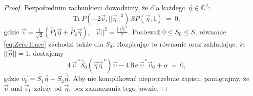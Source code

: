 {\begin{proof}
Bezpośrednim rachunkiem dowodzimy, że dla każdego
$\vec{\eta} \in \mathbb{C}^{2}$:
\begin{equation}
 \label{eq:ZeroTrace}
 \text{Tr} \, P(-2\vec{\upsilon}, ||\vec{\eta}||^{2}) \, S P(\vec{\eta},1)
     \:=\: 0,
\end{equation}
gdzie $\vec{\upsilon} =
 \frac{1}{\sqrt{2}} \left(
  \hat{P}_{1} \vec{\eta} + \hat{P}_{2} \overline{\vec{\eta}}
 \right)$,
$||\vec{\upsilon}||^{2} = \tfrac{||\vec{\eta}||^{2}}{2}$.
Ponieważ $0 \leq S_{0} \leq S$, równanie
\eqref{eq:ZeroTrace} zachodzi także dla $S_{0}$.
Rozpisując to równanie oraz zakładając, że $||\vec{\eta}|| = 1$,
dostajemy
\begin{equation}
 \label{eq:ZeroTraceExplicit}
 4 \, \vec{\upsilon}^{\,*} \hat{S}_{0}(\vec{\eta} \vec{\eta}^{\,*}) \vec{\upsilon} -
 4 \, \text{Re} \, \vec{\upsilon}^{\,*} \vec{\upsilon}_{0} + \alpha \: = \: 0,
\end{equation}
gdzie $\vec{\upsilon_{0}} = S_{1} \vec{\eta} + S_{2} \overline{\vec{\eta}}$.
Aby nie komplikować niepotrzebnie zapisu,
pamiętajmy, że $\vec{\upsilon}$ and $\vec{\upsilon}_{0}$ zależy od $\vec{\eta}$,
bez zaznaczania tego jawnie.


\end{proof}}
